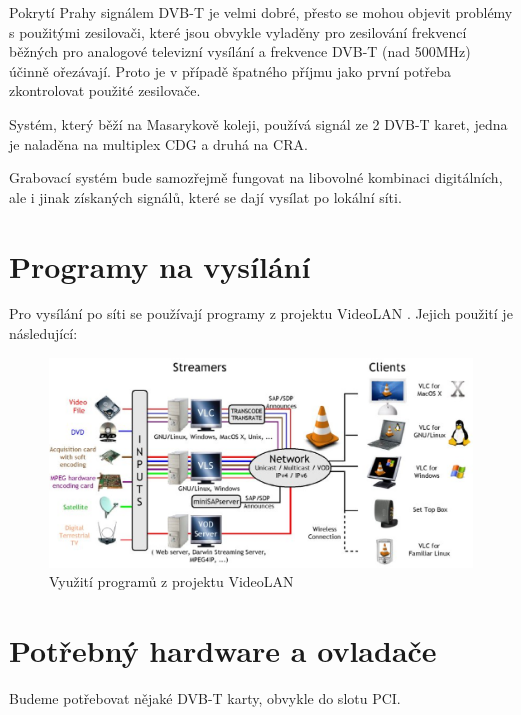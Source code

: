Pokrytí Prahy signálem DVB-T je velmi dobré, přesto se mohou objevit problémy s použitými zesilovači, které jsou obvykle vyladěny pro zesilování frekvencí běžných pro analogové televizní vysílání a frekvence DVB-T (nad 500MHz) účinně ořezávají. Proto je v případě špatného příjmu jako první potřeba zkontrolovat použité zesilovače.

Systém, který běží na Masarykově koleji, používá signál ze 2 DVB-T karet, jedna je naladěna na multiplex CDG a druhá na CRA. 

Grabovací systém bude samozřejmě fungovat na libovolné kombinaci digitálních, ale i jinak získaných signálů, které se dají vysílat po lokální síti.

\section{Programy na vysílání}

\vspace{10pt}
Pro vysílání po síti se používají programy z projektu VideoLAN \cite{videolanURL}. Jejich použití je následující:

\vspace{10pt}

\begin{figure}[ht]
\begin{center}
\includegraphics[width=15cm]{images/videolan.eps}
\caption{Využití programů z projektu VideoLAN}
\label{fig:videolan}
\end{center}
\end{figure}

\vspace{10pt}

\section{Potřebný hardware a ovladače}
Budeme potřebovat nějaké DVB-T karty, obvykle do slotu PCI.

